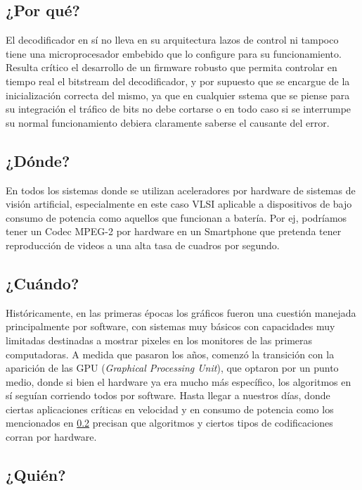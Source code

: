 \documentclass[a4,a4paper]{article}
\begin{document}
\pagebreak
\newpage

\subsection{¿Por qué?}
\label{sec:por-que}

El decodificador en sí no lleva en su arquitectura lazos de control ni tampoco tiene una microprocesador embebido que lo configure para su funcionamiento. Resulta crítico el desarrollo de un firmware robusto que permita controlar en tiempo real el bitstream del decodificador, y por supuesto que se encargue de la inicialización correcta del mismo, ya que en cualquier sstema que se piense para su integración el tráfico de bits no debe cortarse o en todo caso si se interrumpe su normal funcionamiento debiera claramente saberse el causante del error.

\subsection{¿Dónde?}
\label{sec:donde}

En todos los sistemas donde se utilizan aceleradores por hardware de sistemas de visión artificial, especialmente en este caso VLSI aplicable a dispositivos de bajo consumo de potencia como aquellos que funcionan a batería. Por ej, podríamos tener un Codec MPEG-2 por hardware en un Smartphone que pretenda tener reproducción de videos a una alta tasa de cuadros por segundo.

\subsection{¿Cuándo?}
\label{sec:cuando}

Históricamente, en las primeras épocas los gráficos fueron una cuestión manejada principalmente por software, con sistemas muy básicos con capacidades muy limitadas destinadas a mostrar pixeles en los monitores de las primeras computadoras. A medida que pasaron los años, comenzó la transición con la aparición de las GPU (\textit{Graphical Processing Unit}), que optaron por un punto medio, donde si bien el hardware ya era mucho más específico, los algoritmos en sí seguían corriendo todos por software. Hasta llegar a nuestros días, donde ciertas aplicaciones críticas en velocidad y en consumo de potencia como los mencionados en \ref{sec:donde} precisan que algoritmos y ciertos tipos de codificaciones corran por hardware.

\subsection{¿Quién?}
\label{sec:quien}
\end{document}
